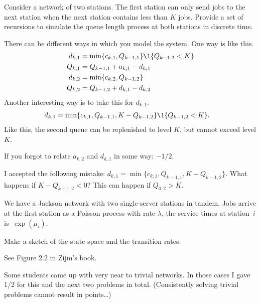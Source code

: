 \begin{exercise}[201804]
Consider a network of two stations. The first station can only send jobs to the next station when the next station contains less than $K$ jobs. Provide a set of recursions to simulate the queue length process at both stations in discrete time. 

\begin{solution}
 There can be different ways in which you model the system. One way is like this.
 \begin{align*}
 d_{k,1} &= \min\{c_{k,1}, Q_{k-1, 1}\}\1{Q_{k-1,2}<K} \\
 Q_{k,1} &= Q_{k-1,1} + a_{k,1} - d_{k,1}\\
 d_{k,2} &= \min\{c_{k,2}, Q_{k-1, 2}\} \\
 Q_{k,2} &= Q_{k-1,2} + d_{k,1} - d_{k,2}\\
 \end{align*}
Another interesting way is to take this for $d_{k,1}$.
 \begin{align*}
 d_{k,1} &= \min\{c_{k,1}, Q_{k-1, 1}, K-Q_{k-1,2}\}\1{Q_{k-1,2}<K}.
 \end{align*}
Like this, the second queue can be replenished to level $K$, but cannot exceed level $K$. 

If you forgot to relate $a_{k,2}$ and $d_{k,1}$ in some way: $-1/2$. 

I accepted the following mistake: 
$d_{k,1} = \min\{c_{k,1}, Q_{k-1, 1}, K-Q_{k-1,2}\}$. What happens if $K-Q_{k-1,2}<0$? This can happen if $Q_{0,2} > K$.

\end{solution}
\end{exercise}

We have a Jackson network with two single-server stations in tandem. Jobs
arrive at the first station as a Poisson process with rate $\lambda$,
the service times at station~$i$ is $~\exp(\mu_i)$.


\begin{exercise}[201804]
Make a sketch of the state space and the transition rates.
\begin{solution}
 See Figure 2.2 in Zijm's book.

Some students came up with very near to trivial networks. In those cases I gave 1/2 for this and the next two problems in total. (Consistently solving trivial problems cannot result in points\ldots)
\end{solution}
\end{exercise}

